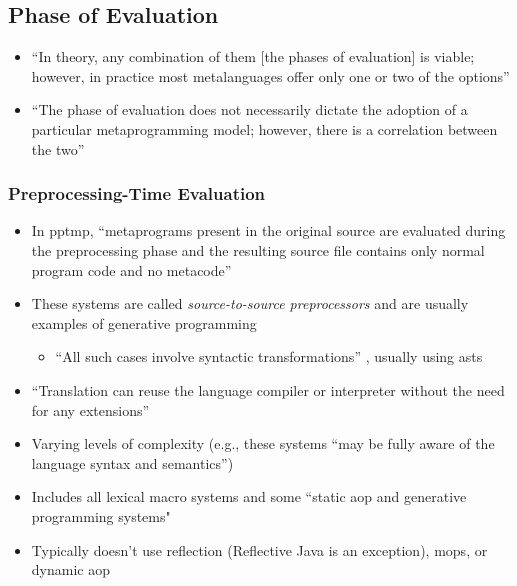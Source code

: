 \subsection{Phase of Evaluation}
\begin{itemize}
      \item ``In theory, any combination of them [the phases of evaluation] is
            viable; however, in practice most metalanguages offer only one or
            two of the options'' \citep[p.~113:20]{lilis_survey_2019}
      \item ``The phase of evaluation does not necessarily dictate the adoption
            of a particular metaprogramming model; however, there is a
            correlation between the two'' \citep[p.~113:20]{lilis_survey_2019}
\end{itemize}

\subsubsection{Preprocessing-Time Evaluation \citep[p.~113:20-21]{lilis_survey_2019}}
\begin{itemize}
      \item In \acf{pptmp}, ``metaprograms present in the original source are
            evaluated during the preprocessing phase and the resulting source
            file contains only normal program code and no metacode''
            \citep[p.~113:20]{lilis_survey_2019}
      \item These systems are called \emph{source-to-source preprocessors}
            \citep[p.~113:20]{lilis_survey_2019} and are usually examples of
            generative programming \citep[p.~113:21]{lilis_survey_2019}
            \begin{itemize}
                  \item ``All such cases involve syntactic transformations''
                        \citep[p.~113:21]{lilis_survey_2019}, usually using
                        \acsp{ast}
            \end{itemize}
      \item ``Translation can reuse the language compiler or interpreter
            without the need for any extensions'' \citep[p.~113:20]{lilis_survey_2019}
      \item Varying levels of complexity (e.g., these systems ``may be fully
            aware of the language syntax and semantics'')
            \citep[p.~113:20]{lilis_survey_2019}
      \item Includes all lexical macro systems \citep[p.~113:20]{lilis_survey_2019}
            and some ``static \acs{aop} and generative programming systems"
            \citep[p.~113:31]{lilis_survey_2019}
      \item Typically doesn't use reflection (Reflective Java is an exception),
            \acsp{mop}, or dynamic \acs{aop} \citep[p.~113:21]{lilis_survey_2019}
\end{itemize}


